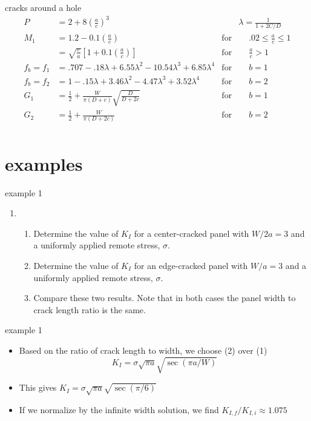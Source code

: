 \documentclass[10pt]{beamer}
\begin{document}
\begin{frame}{cracks around a hole}
	\begin{align*}
	P &= 2+ 8\left(\frac{a}{c}\right)^3 & \qquad \lambda = \frac{1}{1+2C/D}\\
	M_1 &=1.2 - 0.1 \left(\frac{a}{c}\right) & \text{for} \qquad .02 \le \frac{a}{c} \le 1\\
	&= \sqrt{\frac{c}{a}} \left[1+ 0.1 \left(\frac{a}{c}\right)\right] & \text{for} \qquad \frac{a}{c} > 1\\
	f_b = f_1 &= .707 -.18\lambda + 6.55 \lambda^2 - 10.54 \lambda^3 + 6.85 \lambda^4 & \text{for} \qquad b=1\\
	f_b = f_2 &= 1 -.15\lambda + 3.46 \lambda^2 - 4.47 \lambda^3 + 3.52 \lambda^4 & \text{for} \qquad b=2\\
	G_1 &= \frac{1}{2} + \frac{W}{\pi (D+c)} \sqrt{\frac{D}{D+2c}} & \text{for} \qquad b=1\\
	G_2 &= \frac{1}{2} + \frac{W}{\pi (D+2c)} & \text{for} \qquad b=2\\
	\end{align*}
\end{frame}
\section{examples}
\begin{frame}{example 1}
	\begin{enumerate}
		\item 
		\begin{enumerate}
			\item Determine the value of $K_I$ for a center-cracked panel with $W/2a = 3$ and a uniformly applied remote stress, $\sigma$.
			\item Determine the value of $K_I$ for an edge-cracked panel with $W/a = 3$ and a uniformly applied remote stress, $\sigma$.
			\item Compare these two results. Note that in both cases the panel width to crack length ratio is the same.
		\end{enumerate}
	\end{enumerate}
\end{frame}

\begin{frame}{example 1}
	\begin{itemize}
		\item Based on the ratio of crack length to width, we choose (2) over (1)
		\begin{equation*}
		K_I = \sigma \sqrt{\pi a} \sqrt{\sec (\pi a/W)}
		\end{equation*}
		\item This gives $K_I = \sigma \sqrt{\pi a} \sqrt{\sec (\pi/6)}$
		\item If we normalize by the infinite width solution, we find $K_{I,f}/K_{I,i} \approx 1.075$
	\end{itemize}
\end{frame}
\end{document}
